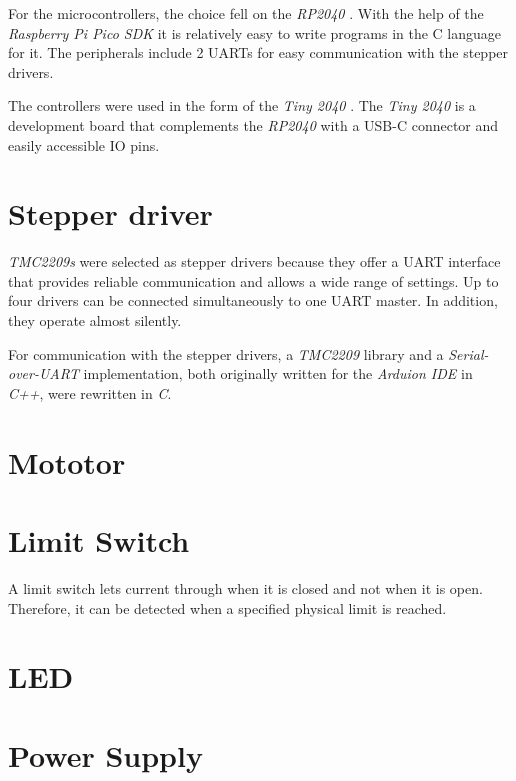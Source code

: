     For the microcontrollers, the choice fell on the  \textit{RP2040} \cite{rp2040}. With the help of the \textit{Raspberry Pi Pico SDK} \cite{sdk} it is relatively easy to write programs in the C language for it. The peripherals include 2 UARTs for easy communication with the stepper drivers. 

    The controllers were used in the form of the \textit{Tiny 2040} \cite{tiny2040}. The \textit{Tiny 2040} is a development board that complements the \textit{RP2040} with a USB-C connector and easily accessible IO pins.


\section{Stepper driver}

    \textit{TMC2209s} were selected as stepper drivers because they offer a UART interface that provides reliable communication and allows a wide range of settings. 
    Up to four drivers can be connected simultaneously to one UART master. In addition, they operate almost silently. \cite{tmc2209}

    For communication with the stepper drivers, a \textit{TMC2209} library \cite{tmcLibrary} and a \textit{Serial-over-UART} implementation, both originally written for the \textit{Arduion IDE} in \textit{C++}, were rewritten in \textit{C}.

\section{Mototor}



\section{Limit Switch}

    A limit switch lets current through when it is closed and not when it is open. Therefore, it can be detected when a specified physical limit is reached.

\section{LED}



\section{Power Supply}


